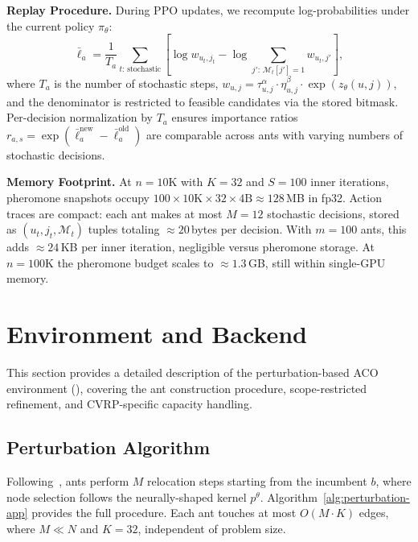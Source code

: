 \documentclass[sigconf,review]{acmart}
\begin{document}
\textbf{Replay Procedure.}
During PPO updates, we recompute log-probabilities under the current policy $\pi_\theta$:
\begin{equation}
\bar{\ell}_a = \frac{1}{T_a}\sum_{t:\, \text{stochastic}} \!\left[ \log w_{u_t, j_t} - \log \!\sum_{j':\, \mathcal{M}_t[j']=1} w_{u_t, j'} \right],
\end{equation}
where $T_a$ is the number of stochastic steps, $w_{u,j} = \tau_{u,j}^\alpha \cdot \eta_{u,j}^\beta \cdot \exp(z_\theta(u,j))$, and the denominator is restricted to feasible candidates via the stored bitmask.
Per-decision normalization by $T_a$ ensures importance ratios $r_{a,s} = \exp(\bar{\ell}_a^{\text{new}} - \bar{\ell}_a^{\text{old}})$ are comparable across ants with varying numbers of stochastic decisions.

\textbf{Memory Footprint.}
At $n=10$K with $K=32$ and $S=100$ inner iterations, pheromone snapshots occupy $100 \times 10\text{K} \times 32 \times 4\text{B} \approx 128$\,MB in fp32.
Action traces are compact: each ant makes at most $M{=}12$ stochastic decisions, stored as $(u_t, j_t, \mathcal{M}_t)$ tuples totaling ${\approx}20$\,bytes per decision.
With $m{=}100$ ants, this adds ${\approx}24$\,KB per inner iteration, negligible versus pheromone storage.
At $n{=}100$K the pheromone budget scales to ${\approx}1.3$\,GB, still within single-GPU memory.


\section{Environment and Backend}
\label{app:backend}

This section provides a detailed description of the perturbation-based ACO environment (), covering the ant construction procedure, scope-restricted refinement, and CVRP-specific capacity handling.

\subsection{Perturbation Algorithm}
\label{app:perturbation}

Following~\cite{faco}, ants perform $M$ relocation steps starting from the incumbent $b$, where node selection follows the neurally-shaped kernel $p^\theta$.
Algorithm~\ref{alg:perturbation-app} provides the full procedure.
Each ant touches at most $O(M \cdot K)$ edges, where $M \ll N$ and $K{=}32$, independent of problem size.
\end{document}

